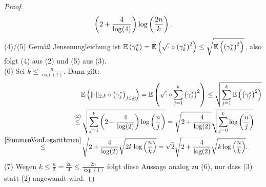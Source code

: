 \begin{proof}
\begin{align*}
\left(2 + \frac 4 {\log(4)} \right)\log\left(\frac {2n} k \right)\text.
\end{align*}
(4)/(5) Gemäß Jensenungleichung ist
$\mathbb{E}\left(\gamma_k^\ast \right)= 
\mathbb{E}\left(\sqrt\cdot \circ \left(\gamma_k^\ast \right)^2 \right)
\le \sqrt{\mathbb{E}\left(\left(\gamma_k^\ast\right)^2 \right)}$, also
folgt (4) aus (2) und (5) aus (3).\\
(6) Sei $k \le \frac n {\exp(1)}$. Dann gilt:
\begin{align*}
& \E\left(\norm\cdot_{2,k} \circ 
	\left(\gamma_j^\ast\right)_{j\in \haken k}   \right)
= \E\left(\sqrt\cdot \circ \sum_{j=1}^k \left(\gamma_j^\ast\right)^2 \right)
\le \sqrt{\sum_{j=1}^k \E\left(\left(\gamma_j^\ast\right)^2 \right)}\\
\overset{(2)}\le&\, \sqrt{\sum_{j=1}^k\left(2+\frac 4{\log(2)} \right)
\log\left(\frac n j\right)}
=\sqrt{2+\frac 4{\log(2)}}\sqrt{\sum_{j=0}^k\log\left(\frac n j\right)}\\
\overset{\ref{SummenVonLogarithmen}}\le&\,
\sqrt{2+\frac 4{\log(2)}}\sqrt{2 k \log\left(\frac n k \right)}
= \sqrt 2 \sqrt{2+\frac 4{\log(2)}}\sqrt{k \log \left(\frac n k \right)}\text.
\end{align*}
(7) Wegen $k \le \frac n 2 = \frac{2n} 4 \le \frac{2n}{\exp(1)}$ folgt diese
Aussage analog zu (6), nur dass (3) statt (2) angewandt wird.
\end{proof}